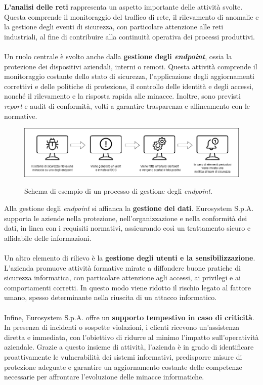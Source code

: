 \textbf{L'analisi delle reti} rappresenta un aspetto importante delle attività svolte. Questa comprende il monitoraggio del traffico di rete, il rilevamento di anomalie e la gestione degli eventi di sicurezza, con particolare attenzione alle reti industriali, al fine di contribuire alla continuità operativa dei processi produttivi.\\\\  
Un ruolo centrale è svolto anche dalla \textbf{gestione degli \textit{endpoint}}, ossia la protezione dei dispositivi aziendali, interni o remoti. Questa attività comprende il monitoraggio costante dello stato di sicurezza, l'applicazione degli aggiornamenti correttivi e delle politiche di protezione, il controllo delle identità e degli accessi, nonché il rilevamento e la risposta rapida alle minacce. Inoltre, sono previsti \textit{report} e \gls{audit} di conformità, volti a garantire trasparenza e allineamento con le normative.  
\begin{figure}[H]
    \centering
    \includegraphics[alt={Schema Endpoint governance}, width=\columnwidth]{img/endpoint.png}
    \caption{Schema di esempio di un processo di gestione degli \textit{endpoint}.}
    \label{fig:endpoint_governance}    
\end{figure}  
Alla gestione degli \textit{endpoint} si affianca la \textbf{gestione dei dati}. Eurosystem S.p.A. supporta le aziende nella protezione, nell'organizzazione e nella conformità dei dati, in linea con i requisiti normativi, assicurando così un trattamento sicuro e affidabile delle informazioni.\\\\  
Un altro elemento di rilievo è la \textbf{gestione degli utenti e la sensibilizzazione}. L'azienda promuove attività formative mirate a diffondere buone pratiche di sicurezza informatica, con particolare attenzione agli accessi, ai privilegi e ai comportamenti corretti. In questo modo viene ridotto il rischio legato al fattore umano, spesso determinante nella riuscita di un attacco informatico.\\\\  
Infine, Eurosystem S.p.A. offre un \textbf{supporto tempestivo in caso di criticità}. In presenza di incidenti o sospette violazioni, i clienti ricevono un'assistenza diretta e immediata, con l'obiettivo di ridurre al minimo l'impatto sull'operatività aziendale.  
Grazie a questo insieme di attività, l'azienda è in grado di identificare proattivamente le vulnerabilità dei sistemi informativi, predisporre misure di protezione adeguate e garantire un aggiornamento costante delle competenze necessarie per affrontare l'evoluzione delle minacce informatiche.  
